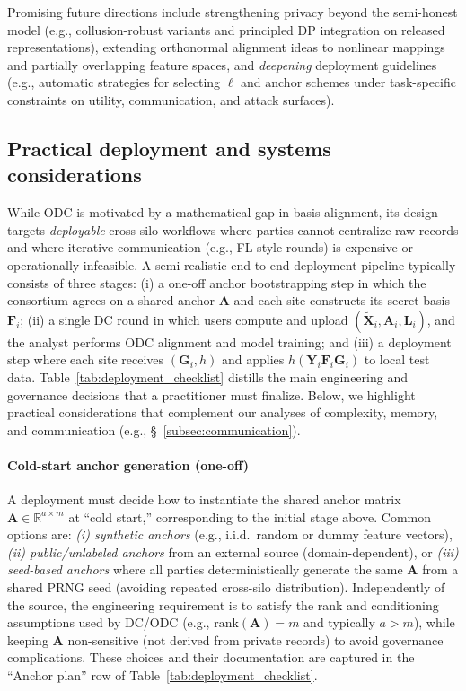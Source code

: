 \documentclass[final,3p,times]{elsarticle}
\theoremstyle{plain}
\newcommand{\matr}[1]{\bm{#1}}        %
\begin{document}
Promising future directions include strengthening privacy beyond the semi-honest model (e.g., collusion-robust variants and principled DP integration on released representations), extending orthonormal alignment ideas to nonlinear mappings and partially overlapping feature spaces, and \emph{deepening} deployment guidelines (e.g., automatic strategies for selecting $\ell$ and anchor schemes under task-specific constraints on utility, communication, and attack surfaces).

\subsection{Practical deployment and systems considerations}
\label{sec:deployment}

While ODC is motivated by a mathematical gap in basis alignment, its design targets \emph{deployable} cross-silo workflows where parties cannot centralize raw records and where iterative communication (e.g., FL-style rounds) is expensive or operationally infeasible. A semi-realistic end-to-end deployment pipeline typically consists of three stages: (i) a one-off anchor bootstrapping step in which the consortium agrees on a shared anchor $\matr{A}$ and each site constructs its secret basis $\matr{F}_i$; (ii) a single DC round in which users compute and upload $(\tilde{\matr{X}}_i,\matr{A}_i,\matr{L}_i)$, and the analyst performs ODC alignment and model training; and (iii) a deployment step where each site receives $(\matr{G}_i,h)$ and applies $h(\matr{Y}_i \matr{F}_i \matr{G}_i)$ to local test data. Table~\ref{tab:deployment_checklist} distills the main engineering and governance decisions that a practitioner must finalize. Below, we highlight practical considerations that complement our analyses of complexity, memory, and communication (e.g., \S~\ref{subsec:communication}).

\paragraph{Cold-start anchor generation (one-off)}
A deployment must decide how to instantiate the shared anchor matrix $\matr{A}\in\mathbb{R}^{a\times m}$ at “cold start,” corresponding to the initial stage above. Common options are: \emph{(i) synthetic anchors} (e.g., i.i.d.\ random or dummy feature vectors), \emph{(ii) public/unlabeled anchors} from an external source (domain-dependent), or \emph{(iii) seed-based anchors} where all parties deterministically generate the same $\matr{A}$ from a shared PRNG seed (avoiding repeated cross-silo distribution). Independently of the source, the engineering requirement is to satisfy the rank and conditioning assumptions used by DC/ODC (e.g., $\mathrm{rank}(\matr{A})=m$ and typically $a>m$), while keeping $\matr{A}$ non-sensitive (not derived from private records) to avoid governance complications. These choices and their documentation are captured in the “Anchor plan” row of Table~\ref{tab:deployment_checklist}.
\end{document}
